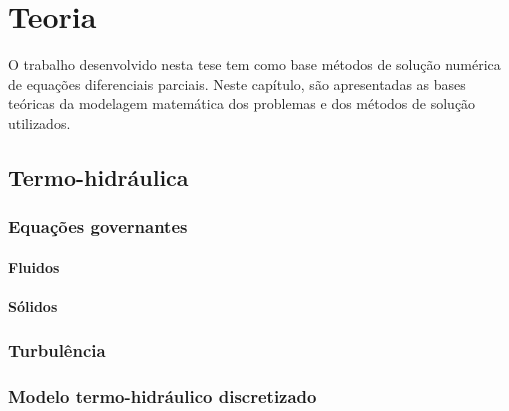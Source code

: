 \chapter{Teoria}
\label{chap:teoria}

O trabalho desenvolvido nesta tese tem como base métodos de
solução numérica de equações diferenciais parciais. Neste capítulo, são
apresentadas as bases teóricas da modelagem matemática
dos problemas e dos métodos de solução utilizados.



\section{Termo-hidráulica}
\label{sec:th}

\subsection{Equações governantes}
\label{subsec:eq}

\subsubsection{Fluidos}
\label{ssubsec:fluid}

\subsubsection{Sólidos}
\label{ssubsec:solid}

\subsection{Turbulência}
\label{subsec:}

\subsection{Modelo termo-hidráulico discretizado}
\label{subsec:modeloth}

